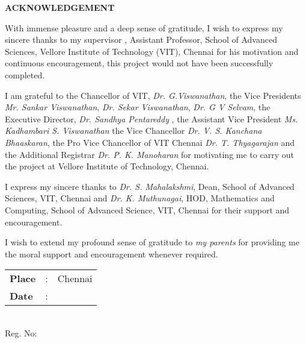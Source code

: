 
\thispagestyle{plain}
\begin{center}
	{\Large \bf \MakeUppercase{Acknowledgement}}
\end{center}

With immense pleasure and a deep sense of gratitude, I wish to express my sincere thanks to my supervisor \emph{\theguide}, Assistant Professor, School of Advanced Sciences, Vellore Institute of Technology (VIT), Chennai for his motivation and continuous encouragement, this project would not have been successfully completed.

 I am grateful to the Chancellor of VIT, {\em Dr. G.Viswanathan}, the Vice Presidents {\em Mr. Sankar Viswanathan}, {\em Dr. Sekar Viswanathan}, {\em Dr. G V Selvam}, the Executive Director, {\em Dr. Sandhya Pentareddy} , the Assistant Vice President {\em Ms. Kadhambari S. Viswanathan} the Vice Chancellor {\em Dr. V. S. Kanchana Bhaaskaran}, the Pro Vice Chancellor of VIT Chennai {\em Dr. T. Thyagarajan} and the Additional Registrar {\em Dr. P. K. Manoharan} for motivating me to carry out the project at Vellore Institute of Technology, Chennai.

 I express my sincere thanks to {\em Dr. S. Mahalakshmi}, Dean, School of Advanced Sciences, VIT, Chennai and {\em Dr. K. Muthunagai}, HOD, Mathematics and Computing, School of Advanced Science,  VIT, Chennai for their support and encouragement.


 I wish to extend my profound sense of gratitude to {\em my parents} for providing me the moral support and encouragement whenever required.   



\vspace{3\baselineskip}

\begingroup
\linespread{1} \selectfont

\begin{minipage}{.5\textwidth}
	\raggedright
	\begin{tabular}{lcl}
		\textbf{Place}  & : & Chennai \\
		\textbf{Date} & : &
	\end{tabular}
\end{minipage}%
\begin{minipage}{.5\textwidth}
		\raggedleft
		\thestudent\\
		Reg. No: \theregno\\
\end{minipage}

 \endgroup
